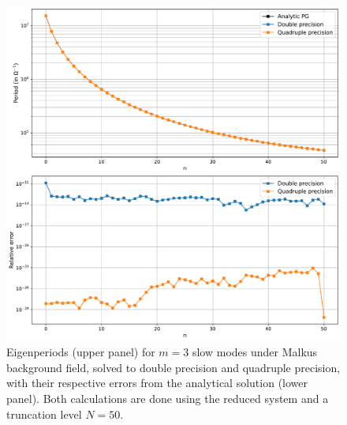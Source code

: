 \begin{figure}[htbp]
    \centering
    \includegraphics[width=.8\linewidth]{../../out/eigen/Malkus/Reduced/Analytical_error_precision_slow.pdf}
    \caption{Eigenperiods (upper panel) for $m=3$ slow modes under Malkus background field, solved to double precision and quadruple precision, with their respective errors from the analytical solution (lower panel). Both calculations are done using the reduced system and a truncation level $N=50$.}
\end{figure}


